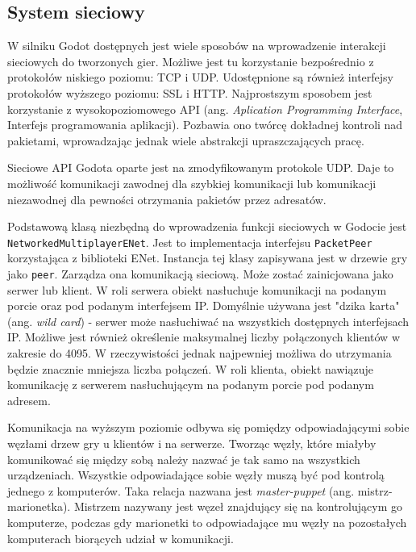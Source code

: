 
\subsection{System sieciowy}
W silniku Godot dostępnych jest wiele sposobów na wprowadzenie interakcji sieciowych do tworzonych gier. Możliwe jest tu korzystanie bezpośrednio z protokołów niskiego poziomu: TCP i UDP. Udostępnione są również interfejsy protokołów wyższego poziomu: SSL i HTTP. Najprostszym sposobem jest korzystanie z wysokopoziomowego API (ang. \emph{Aplication Programming Interface}, Interfejs programowania aplikacji). Pozbawia ono twórcę dokładnej kontroli nad pakietami, wprowadzając jednak wiele abstrakcji upraszczających pracę.

Sieciowe API Godota oparte jest na zmodyfikowanym protokole UDP. Daje to możliwość komunikacji zawodnej dla szybkiej komunikacji lub komunikacji niezawodnej dla pewności otrzymania pakietów przez adresatów. 

Podstawową klasą niezbędną do wprowadzenia funkcji sieciowych w Godocie jest \texttt{NetworkedMultiplayerENet}. Jest to implementacja interfejsu \texttt{PacketPeer} korzystająca z biblioteki ENet\cite{enet}. Instancja tej klasy zapisywana jest w drzewie gry jako \texttt{peer}. Zarządza ona komunikacją sieciową. Może zostać zainicjowana jako serwer lub klient. W roli serwera obiekt nasłuchuje komunikacji na podanym porcie oraz pod podanym interfejsem IP. Domyślnie używana jest "dzika karta" (ang. \emph{wild card}) - serwer może nasłuchiwać na wszystkich dostępnych interfejsach IP. Możliwe jest również określenie maksymalnej liczby połączonych klientów w zakresie do 4095. W rzeczywistości jednak najpewniej możliwa do utrzymania będzie znacznie mniejsza liczba połączeń. W roli klienta, obiekt nawiązuje komunikację z serwerem nasłuchującym na podanym porcie pod podanym adresem. 

Komunikacja na wyższym poziomie odbywa się pomiędzy odpowiadającymi sobie węzłami drzew gry u klientów i na serwerze. Tworząc węzły, które miałyby komunikować się między sobą należy nazwać je tak samo na wszystkich urządzeniach. Wszystkie odpowiadające sobie węzły muszą być pod kontrolą jednego z komputerów. Taka relacja nazwana jest \emph{master-puppet} (ang. mistrz-marionetka). Mistrzem nazywany jest węzeł znajdujący się na kontrolującym go komputerze, podczas gdy marionetki to odpowiadające mu węzły na pozostałych komputerach biorących udział w komunikacji.

